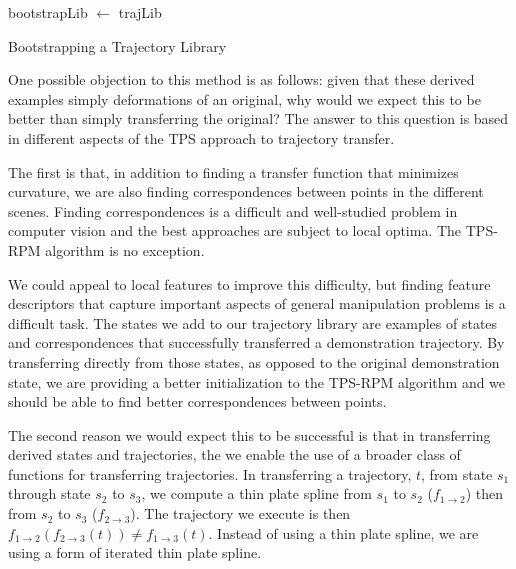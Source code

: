\begin{algorithm}

 bootstrapLib $\leftarrow$ trajLib\;
 \caption{Bootstrapping a Trajectory Library}
 \label{alg:bootstrap}
\end{algorithm}

One possible objection to this method is as follows: given that these derived examples
simply deformations of an original, why would we expect this to be better than simply
transferring the original? The answer to this question is based in different
aspects of the TPS approach to trajectory transfer.

The first is that, in addition to finding a transfer function that minimizes curvature,
we are also finding correspondences between points in the different scenes. Finding 
correspondences is a difficult and well-studied problem in computer vision and the best
approaches are subject to local optima. The TPS-RPM algorithm is no exception. 

We could appeal to local features to improve this difficulty, but finding feature descriptors 
that capture important aspects of general manipulation problems is a difficult task. The
states we add to our trajectory library are examples of states and correspondences that 
successfully transferred a demonstration trajectory. By transferring directly from those
states, as opposed to the original demonstration state, we are providing a better 
initialization to the TPS-RPM algorithm and we should be able to find better correspondences
between points.

The second reason we would expect this to be successful is that in transferring derived
states and trajectories, the we enable the use of a broader class of functions for 
transferring trajectories. In transferring a trajectory, $t$, from state $s_1$ through
state $s_2$ to $s_3$, we compute a thin plate spline from $s_1$ to $s_2$ 
($f_{1\rightarrow 2}$) then from $s_2$ to $s_3$ ($f_{2\rightarrow 3}$). The trajectory we
execute is then $f_{1\rightarrow 2}(f_{2\rightarrow 3}(t)) \ne f_{1\rightarrow 3}(t)$. 
Instead of using a thin plate spline, we are using a form of iterated thin plate spline.

